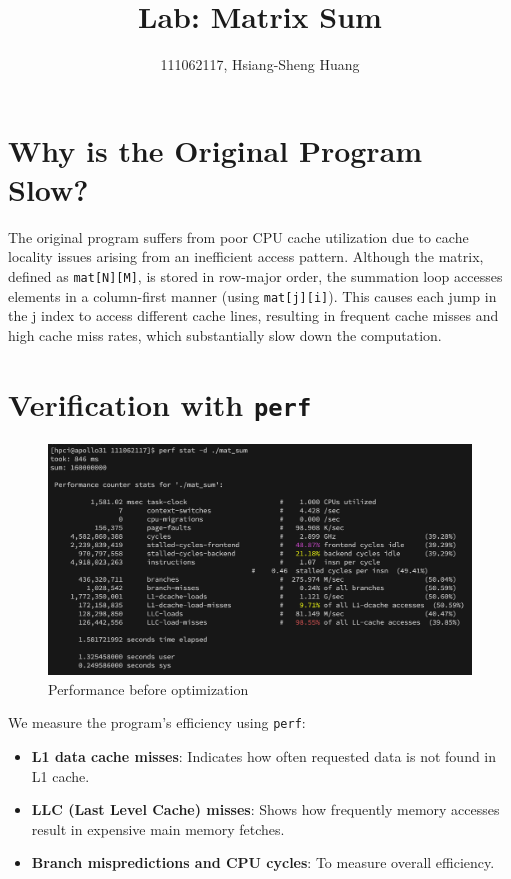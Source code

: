 \documentclass{article}
\title{Lab: Matrix Sum}
\author{111062117, Hsiang-Sheng Huang}
\begin{document}
\maketitle

\section{Why is the Original Program Slow?}
The original program suffers from poor CPU cache utilization due to cache locality issues arising from an inefficient access pattern. Although the matrix, defined as \texttt{mat[N][M]}, is stored in row-major order, the summation loop accesses elements in a column-first manner (using \texttt{mat[j][i]}). This causes each jump in the j index to access different cache lines, resulting in frequent cache misses and high cache miss rates, which substantially slow down the computation.

\section{Verification with \texttt{perf}}
\begin{figure}[h]
    \centering
    \includegraphics[width=0.7\linewidth]{./img/img-1.png}
    \caption{Performance before optimization}
\end{figure}

We measure the program's efficiency using \texttt{perf}:

\begin{itemize}
    \item \textbf{L1 data cache misses}: Indicates how often requested data is not found in L1 cache.
    \item \textbf{LLC (Last Level Cache) misses}: Shows how frequently memory accesses result in expensive main memory fetches.
    \item \textbf{Branch mispredictions and CPU cycles}: To measure overall efficiency.
\end{itemize}
\end{document}
